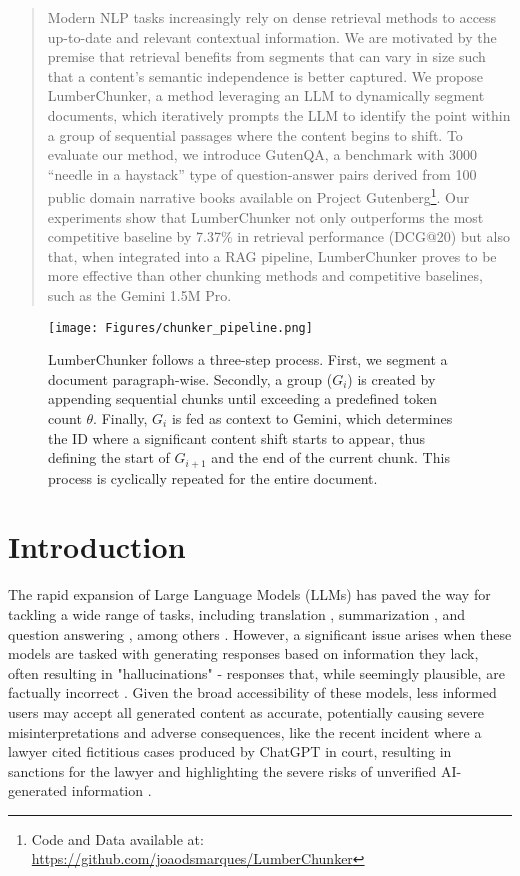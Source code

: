 \begin{abstract}
Modern NLP tasks increasingly rely on dense retrieval methods to access up-to-date and relevant contextual information. We are motivated by the premise that retrieval benefits from segments that can vary in size such that a content’s semantic independence is better captured. We propose LumberChunker, a method leveraging an LLM to dynamically segment documents, which iteratively prompts the LLM to identify the point within a group of sequential passages where the content begins to shift. To evaluate our method, we introduce GutenQA, a benchmark with 3000 ``needle in a haystack'' type of question-answer pairs derived from 100 public domain narrative books available on Project Gutenberg\footnote{Code and Data available at: \url{https://github.com/joaodsmarques/LumberChunker}}. Our experiments show that LumberChunker not only outperforms the most competitive baseline by 7.37\% in retrieval performance (DCG@20) but also that, when integrated into a RAG pipeline, LumberChunker proves to be more effective than other chunking methods and competitive baselines, such as the Gemini 1.5M Pro.
\end{abstract}



\begin{figure*}[h]
  \centering
  \texttt{[image: Figures/chunker\_pipeline.png]}
  \caption{LumberChunker follows a three-step process. First, we segment a document paragraph-wise. Secondly, a group ($G_i$) is created by appending sequential chunks until exceeding a predefined token count $\theta$. Finally, $G_i$ is fed as context to Gemini, which determines the ID where a significant content shift starts to appear, thus defining the start of $G_{i+1}$ and the end of the current chunk. This process is cyclically repeated for the entire document.}
    \label{fig:LumberChunker-Pipeline}
  \label{fig:method_full_pipeline}
\end{figure*}


\section{Introduction}



The rapid expansion of Large Language Models (LLMs) has paved the way for tackling a wide range of tasks, including translation \cite{tower}, summarization \cite{summarization}, and question answering \cite{palm}, among others \cite{xuandong_llms}. However, a significant issue arises when these models are tasked with generating responses based on information they lack, often resulting in "hallucinations" - responses that, while seemingly plausible, are factually incorrect \cite{zhang2023siren}. Given the broad accessibility of these models, less informed users may accept all generated content as accurate, potentially causing severe misinterpretations and adverse consequences, like the recent incident where a lawyer cited fictitious cases produced by ChatGPT \cite{ChatGPT} in court, resulting in sanctions for the lawyer and highlighting the severe risks of unverified AI-generated information \cite{law_hallucination}.

